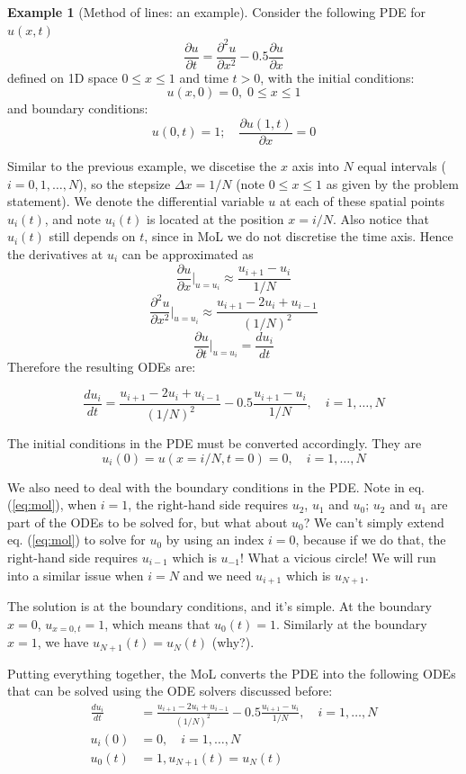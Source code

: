 \documentclass[a4paper,11pt]{article}
\theoremstyle{definition}
\newtheorem{exmp}{Example}[section]
\begin{document}
\begin{exmp}[Method of lines: an example]

Consider the following PDE for $u(x, t)$
\[ \frac{\partial u}{\partial t} = \frac{\partial^2 u}{\partial x^2} - 0.5 \frac{\partial u}{\partial x} \]
defined on 1D space $0 \leq x \leq 1$ and time $t > 0$,
with the initial conditions:
\[ u(x, 0) = 0, \; 0 \leq x \leq 1 \]
and boundary conditions:
\[ u(0, t) = 1; \quad \frac{\partial u(1, t)}{\partial x} = 0 \]

Similar to the previous example, we discetise the $x$ axis into $N$ equal intervals ($i=0, 1, \ldots, N$), so the stepsize
$\Delta x = 1/N$ (note $0 \leq x \leq 1$ as given by the problem statement). We denote
the differential variable $u$ at each of these spatial points $u_i(t)$, and note $u_i(t)$ is located at the position
$x = i / N$. Also notice that $u_i(t)$ still depends on $t$, since in MoL we do not discretise the time axis.
Hence the derivatives at $u_i$ can be approximated as
\[ \frac{\partial u}{\partial x}\Big|_{u=u_i} \approx  \frac{u_{i+1} - u_i}{1/N} \]
\[ \frac{\partial^2 u}{\partial x^2}\Big|_{u=u_i} \approx  \frac{u_{i+1} - 2 u_i + u_{i-1}}{(1/N)^2} \]
\[ \frac{\partial u}{\partial t}\Big|_{u=u_i} = \frac{d u_i}{d t} \]
Therefore the resulting ODEs are:

\begin{equation} \label{eq:mol}
	\frac{d u_i}{d t} = \frac{u_{i+1} - 2 u_i + u_{i-1}}{(1/N)^2} - 0.5 \frac{u_{i+1} - u_i}{1/N},
	\quad i=1,\ldots,N
\end{equation}

The initial conditions in the PDE must be converted accordingly. They are
\[ u_i(0) = u(x = i / N, t=0) = 0, \quad i=1,\ldots,N \]

We also need to deal with the boundary conditions in the PDE. Note in eq. (\ref{eq:mol}),
when $i=1$, the right-hand side requires $u_2$, $u_1$ and $u_0$; $u_2$ and $u_1$ are part of the
ODEs to be solved for, but what about $u_0$? We can't simply extend eq. (\ref{eq:mol}) to 
solve for $u_0$ by using an index $i=0$, because if we do that, the right-hand side requires $u_{i-1}$
which is $u_{-1}$! What a vicious circle! We will run into a similar issue when $i=N$ and we need $u_{i+1}$
which is $u_{N+1}$.

The solution is at the boundary conditions, and it's simple. At the boundary $x=0$, 
$u_{x=0,t} = 1$, which means that $u_0(t) = 1$. Similarly at the boundary $x=1$,
we have $u_{N+1}(t) = u_N(t)$ (why?).

Putting everything together, the MoL converts the PDE into the following ODEs that can be solved
using the ODE solvers discussed before:
\begin{align}
	\frac{d u_i}{d t} &= \frac{u_{i+1} - 2 u_i + u_{i-1}}{(1/N)^2} - 0.5 \frac{u_{i+1} - u_i}{1/N},
	\quad i=1,\ldots,N \\
	u_i(0) &= 0, \quad i=1,\ldots,N \\
	u_0(t) &= 1, u_{N+1}(t) = u_N(t)
\end{align}

\end{exmp}
\end{document}
